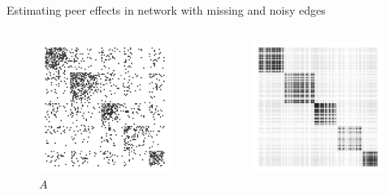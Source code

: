 \documentclass[aspectratio=169]{beamer}
\theoremstyle{remark}
\begin{document}
\begin{frame}{Estimating peer effects in network with missing and noisy edges}
    \begin{columns}
        \begin{figure}
            \includegraphics[width=\textwidth]{figures/matrices/A.png}
            \caption{$A$}
        \end{figure}
        \begin{figure}
            \includegraphics[width=\textwidth]{figures/matrices/P.png}

\end{figure}
\end{columns}
\end{frame}
\end{document}
